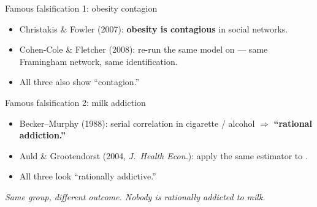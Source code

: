 \documentclass[aspectratio=169,11pt]{beamer}
\begin{document}
\begin{frame}{Famous falsification 1: obesity contagion}
\vspace{0.6em}
\begin{itemize}\setlength\itemsep{0.5em}
  \item Christakis \& Fowler (2007): \;\textbf{obesity is contagious} in social networks.
  \item Cohen-Cole \& Fletcher (2008): \;re-run the same model on  --- same Framingham network, same identification.
  \item All three also show ``contagion.''
\end{itemize}
\vspace{0.8em}
\vspace{0.4em}
\end{frame}

\begin{frame}{Famous falsification 2: milk addiction}
\vspace{0.6em}
\begin{itemize}\setlength\itemsep{0.5em}
  \item Becker--Murphy (1988): \;serial correlation in cigarette / alcohol $\Rightarrow$ \textbf{``rational addiction.''}
  \item Auld \& Grootendorst (2004, \textit{J.\ Health Econ.}): \;apply the same estimator to .
  \item All three look ``rationally addictive.''
\end{itemize}
\vspace{0.8em}
\begin{center}
\small\color{warmgray}\itshape
Same group, different outcome. \;Nobody is rationally addicted to milk. \;
\end{center}
\vspace{0.4em}
\end{frame}
\end{document}
